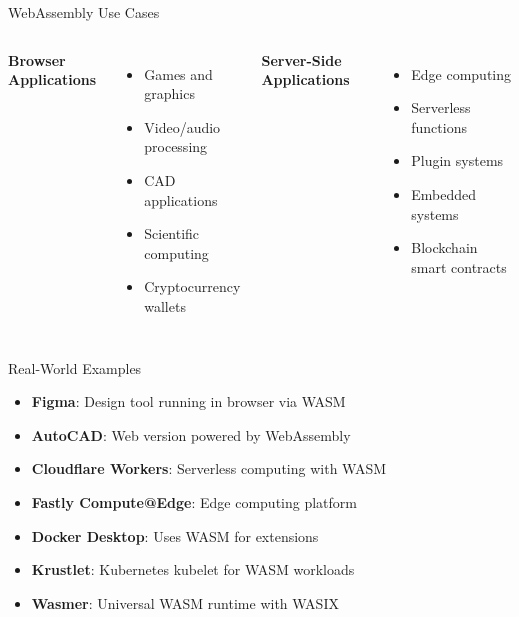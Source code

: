 \documentclass[11pt,aspectratio=169]{beamer}
\begin{document}
\begin{frame}{WebAssembly Use Cases}
\begin{columns}
\textbf{Browser Applications}
\begin{itemize}
    \item Games and graphics
    \item Video/audio processing
    \item CAD applications
    \item Scientific computing
    \item Cryptocurrency wallets
\end{itemize}

\textbf{Server-Side Applications}
\begin{itemize}
    \item Edge computing
    \item Serverless functions
    \item Plugin systems
    \item Embedded systems
    \item Blockchain smart contracts
\end{itemize}
\end{columns}

\vspace{0.5cm}
\begin{center}
\end{center}
\end{frame}

\begin{frame}{Real-World Examples}
\begin{itemize}
    \item \textbf{Figma}: Design tool running in browser via WASM
    \item \textbf{AutoCAD}: Web version powered by WebAssembly
    \item \textbf{Cloudflare Workers}: Serverless computing with WASM
    \item \textbf{Fastly Compute@Edge}: Edge computing platform
    \item \textbf{Docker Desktop}: Uses WASM for extensions
    \item \textbf{Krustlet}: Kubernetes kubelet for WASM workloads
    \item \textbf{Wasmer}: Universal WASM runtime with WASIX
\end{itemize}
\end{frame}
\end{document}
